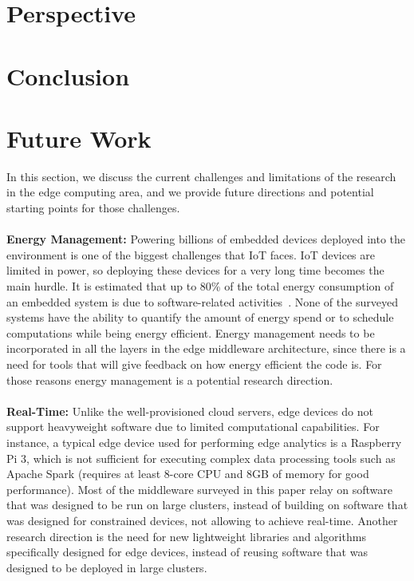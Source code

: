 \section{Perspective}
\section{Conclusion}
\section{Future Work}
In this section, we discuss the current challenges and limitations of the research in the edge computing area, and we provide future directions and potential starting points for those challenges. 
\\\\
\textbf{Energy Management:} Powering billions of embedded devices deployed into the environment is one of the biggest challenges that IoT faces. IoT devices are limited in power, so deploying these devices for a very long time becomes the main hurdle. It is estimated that up to 80\% of the total energy consumption of an embedded system is due to software-related activities~\cite{5402965}. None of the surveyed systems have the ability to quantify the amount of energy spend or to schedule computations while being energy efficient. Energy management needs to be incorporated in all the layers in the edge middleware architecture, since there is a need for tools that will give feedback on how energy efficient the code is. For those reasons energy management is a potential research direction. 
\\\\
\textbf{Real-Time:} Unlike the well-provisioned cloud servers, edge devices do not support heavyweight software due to limited computational capabilities. For instance, a typical edge device used for performing edge analytics is a Raspberry Pi 3, which is not sufficient for executing complex data processing tools such as Apache Spark (requires at least 8-core CPU and 8GB of memory for good performance). Most of the middleware surveyed in this paper relay on software that was designed to be run on large clusters, instead of building on software that was designed for constrained devices, not allowing to achieve real-time. Another research direction is the need for new lightweight libraries and algorithms specifically designed for edge devices, instead of reusing software that was designed to be deployed in large clusters.
\\\\

